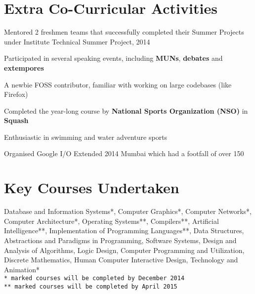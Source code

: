 \documentclass[margin,11pt]{resume}
\begin{document}
\begin{resume}
\section{\mysidestyle Extra Co-Curricular Activities}
\begin{list2}
\item Mentored 2 freshmen teams that successfully completed their Summer Projects under Institute Technical Summer Project, 2014
\item Participated in several speaking events, including \textbf{MUNs}, \textbf{debates} and \textbf{extempores}
\item A newbie FOSS contributor, familiar with working on large codebases (like Firefox)
\item Completed the year-long course by \textbf{National Sports Organization (NSO)} in \textbf{Squash}
\item Enthusiastic in swimming and water adventure sports
\item Organised Google I/O Extended 2014 Mumbai which had a footfall of over 150
\end{list2}


    \section{\mysidestyle Key Courses Undertaken} 

Database and Information Systems*, Computer Graphics*, Computer Networks*, Computer Architecture*, Operating Systems**, Compilers**, Artificial Intelligence**, Implementation of Programming Languages**,  Data Structures, Abstractions and Paradigms in Programming, Software Systems, Design and Analysis of Algorithms, Logic Design, Computer Programming and Utilization, Discrete Mathematics, Human Computer Interactive Design, Technology and Animation* \\
\texttt{* marked courses will be completed by December 2014}\\
\texttt{** marked courses will be completed by April 2015}


\end{resume}
\end{document}
